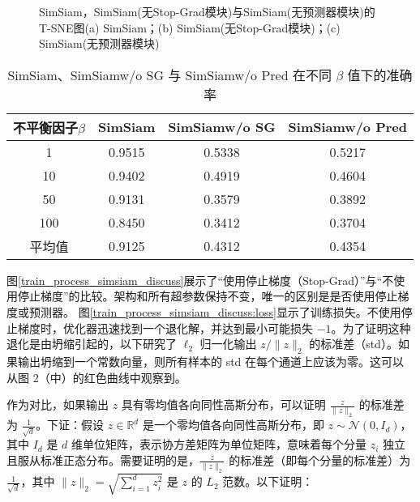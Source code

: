 \documentclass[master]{thesis-uestc}
\begin{document}
\begin{figure}
    \centering
    \caption{SimSiam，SimSiam(无Stop-Grad模块)与SimSiam(无预测器模块)的T-SNE图(a) SimSiam；(b) SimSiam(无Stop-Grad模块)；(c) SimSiam(无预测器模块)}
    \label{tsne_simsiam_discuss}
\end{figure}

\begin{table}
    \caption{SimSiam、SimSiamw/o SG 与 SimSiamw/o Pred 在不同 $\beta$ 值下的准确率}
    \centering
    \begin{tabular}{cccc}
    \toprule
    不平衡因子$\beta$  & SimSiam & SimSiamw/o SG & SimSiamw/o Pred \\
    \midrule
    1   & 0.9515  & 0.5338  & 0.5217 \\
    10  & 0.9402  & 0.4919  & 0.4604 \\
    50  & 0.9131  & 0.3579  & 0.3892 \\
    100 & 0.8450  & 0.3412  & 0.3704 \\
    \midrule
    平均值 & 0.9125 & 0.4312 & 0.4354\\
    \bottomrule
    \end{tabular}
    \label{simsiam_vs_simsiamwosg_wopred}
\end{table}

图\ref{train_process_simsiam_discuss}展示了“使用停止梯度（Stop-Grad）”与“不使用停止梯度”的比较。架构和所有超参数保持不变，唯一的区别是是否使用停止梯度或预测器。
图\ref{train_process_simsiam_discuss:loss}显示了训练损失。不使用停止梯度时，优化器迅速找到一个退化解，并达到最小可能损失 \(-1\)。为了证明这种退化是由坍缩引起的，以下研究了 \(\ell_2\) 归一化输出 \( z / \|z\|_2 \) 的标准差（std）。如果输出坍缩到一个常数向量，则所有样本的 std 在每个通道上应该为零。这可以从图 2（中）的红色曲线中观察到。


作为对比，如果输出 \( z \) 具有零均值各向同性高斯分布，可以证明 \( \frac{z}{\|z\|_2} \) 的标准差为 \( \frac{1}{\sqrt{d}} \)。下证：假设 \( z \in \mathbb{R}^d \) 是一个零均值各向同性高斯分布，即 \( z \sim \mathcal{N}(0, I_d) \)，其中 \( I_d \) 是 \( d \) 维单位矩阵，表示协方差矩阵为单位矩阵，意味着每个分量 \( z_i \) 独立且服从标准正态分布。需要证明的是，\( \frac{z}{\|z\|_2} \) 的标准差（即每个分量的标准差）为 \( \frac{1}{\sqrt{d}} \)，其中 \( \|z\|_2 = \sqrt{\sum_{i=1}^{d} z_i^2} \) 是 \( z \) 的 \( L_2 \) 范数。以下证明：
\end{document}

